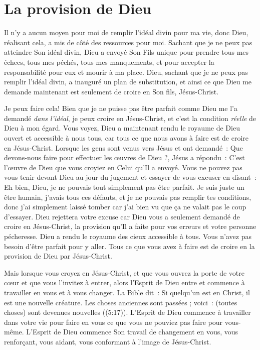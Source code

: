 \section*{La provision de Dieu}

Il n'y a aucun moyen pour moi de remplir l'idéal divin
 pour ma vie, donc Dieu, réalisant cela, a mis de côté
 des ressources pour moi.
 Sachant que je ne peux pas atteindre Son idéal divin,
 Dieu a envoyé Son Fils unique pour prendre tous mes échecs,
 tous mes péchés, tous mes manquements, et pour accepter la responsabilité
 pour eux et mourir à ma place.
 Dieu, sachant que je ne peux pas remplir l'idéal divin,
 a inauguré un plan de substitution, et ainsi ce que Dieu
 me demande maintenant est seulement de croire en Son fils, Jésus-Christ.

Je peux faire cela!
 Bien que je ne puisse pas être parfait
 comme Dieu me l'a demandé \emph{dans l'idéal},
 je peux croire en Jésus-Christ,
 et c'est la condition \emph{réelle} de Dieu à mon égard.
 Vous voyez, Dieu a maintenant rendu le royaume de Dieu ouvert
 et accessible à nous tous, car tous ce que nous avons à faire
 est de croire en Jésus-Christ.
 Lorsque les gens sont venus vers Jésus et ont demandé~:
 \og Que devons-nous faire pour effectuer les œuvres de Dieu ?\fg{},
 Jésus a répondu~:
 \og C'est l'œuvre de Dieu que vous croyiez en Celui qu'Il a envoyé. \fg{}
 Vous ne pouvez pas vous tenir devant Dieu au jour du jugement
 et essayer de vous excuser en disant~:
 \og Eh bien, Dieu, je ne pouvais tout simplement pas être parfait.
 Je suis juste un être humain, j'avais tous ces défauts,
 et je ne pouvais pas remplir tes conditions,
 donc j'ai simplement laissé tomber car j'ai bien vu
 que ça ne valait pas le coup d'essayer. \fg{}
 Dieu rejettera votre excuse car Dieu vous a seulement demandé
 de croire en Jésus-Christ, la provision qu'Il a faite pour vos erreurs
 et votre personne pécheresse.
 Dieu a rendu le royaume des cieux accessible à tous.
 Vous n'avez pas besoin d'être parfait pour y aller.
 Tous ce que vous avez à faire est de croire en la provision
 de Dieu par Jésus-Christ.

Mais lorsque vous croyez en Jésus-Christ,
 et que vous ouvrez la porte de votre cœur
 et que vous l'invitez à entrer,
 alors l'Esprit de Dieu entre et commence à travailler en vous
 et à vous changer.
 La Bible dit~:
 \og Si quelqu'un est en Christ, il est une nouvelle créature.
 Les choses anciennes sont passées ; voici~: (toutes choses)
 sont devenues nouvelles \fg{} ((5:17)).
 L'Esprit de Dieu commence à travailler dans votre vie pour faire
 en vous ce que vous ne pouviez pas faire pour vous-même.
 L'Esprit de Dieu commence Son travail de changement en vous,
 vous renforçant, vous aidant, vous conformant à l'image de Jésus-Christ.


